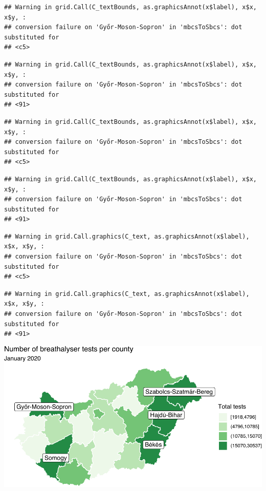 \documentclass[
]{book}
\begin{document}
\begin{verbatim}
## Warning in grid.Call(C_textBounds, as.graphicsAnnot(x$label), x$x, x$y, :
## conversion failure on 'Győr-Moson-Sopron' in 'mbcsToSbcs': dot substituted for
## <c5>
\end{verbatim}

\begin{verbatim}
## Warning in grid.Call(C_textBounds, as.graphicsAnnot(x$label), x$x, x$y, :
## conversion failure on 'Győr-Moson-Sopron' in 'mbcsToSbcs': dot substituted for
## <91>
\end{verbatim}

\begin{verbatim}
## Warning in grid.Call(C_textBounds, as.graphicsAnnot(x$label), x$x, x$y, :
## conversion failure on 'Győr-Moson-Sopron' in 'mbcsToSbcs': dot substituted for
## <c5>
\end{verbatim}

\begin{verbatim}
## Warning in grid.Call(C_textBounds, as.graphicsAnnot(x$label), x$x, x$y, :
## conversion failure on 'Győr-Moson-Sopron' in 'mbcsToSbcs': dot substituted for
## <91>
\end{verbatim}

\begin{verbatim}
## Warning in grid.Call.graphics(C_text, as.graphicsAnnot(x$label), x$x, x$y, :
## conversion failure on 'Győr-Moson-Sopron' in 'mbcsToSbcs': dot substituted for
## <c5>
\end{verbatim}

\begin{verbatim}
## Warning in grid.Call.graphics(C_text, as.graphicsAnnot(x$label), x$x, x$y, :
## conversion failure on 'Győr-Moson-Sopron' in 'mbcsToSbcs': dot substituted for
## <91>
\end{verbatim}

\includegraphics{crime_mapping_files/figure-latex/addcountynamestoponly-1.pdf}
\end{document}
